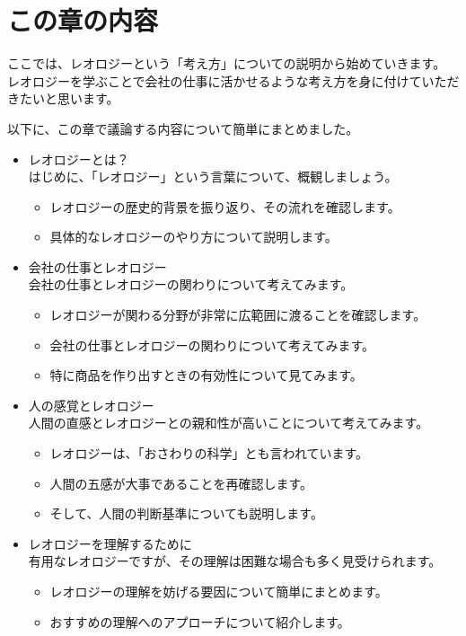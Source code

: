 \documentclass[uplatex,dvipdfmx,a4paper,11pt]{jsarticle}
\begin{document}
\section*{この章の内容}

ここでは、レオロジーという「考え方」についての説明から始めていきます。
レオロジーを学ぶことで会社の仕事に活かせるような考え方を身に付けていただきたいと思います。

以下に、この章で議論する内容について簡単にまとめました。

\begin{boxnote}
	\large
	\begin{itemize}
		\item レオロジーとは？\\はじめに、「レオロジー」という言葉について、概観しましょう。
		\begin{itemize}
			\item レオロジーの歴史的背景を振り返り、その流れを確認します。
			\item 具体的なレオロジーのやり方について説明します。
		\end{itemize} 
		\item 会社の仕事とレオロジー\\会社の仕事とレオロジーの関わりについて考えてみます。
		\begin{itemize}
			\item レオロジーが関わる分野が非常に広範囲に渡ることを確認します。
			\item 会社の仕事とレオロジーの関わりについて考えてみます。
			\item 特に商品を作り出すときの有効性について見てみます。
		\end{itemize} 
		\item 人の感覚とレオロジー\\人間の直感とレオロジーとの親和性が高いことについて考えてみます。
		\begin{itemize}
			\item レオロジーは、「おさわりの科学」とも言われています。
			\item 人間の五感が大事であることを再確認します。
			\item そして、人間の判断基準についても説明します。
		\end{itemize}
		\item レオロジーを理解するために\\有用なレオロジーですが、その理解は困難な場合も多く見受けられます。
		\begin{itemize}
			\item レオロジーの理解を妨げる要因について簡単にまとめます。
			\item おすすめの理解へのアプローチについて紹介します。
		\end{itemize} 
	\end{itemize}
\end{boxnote}
\end{document}
